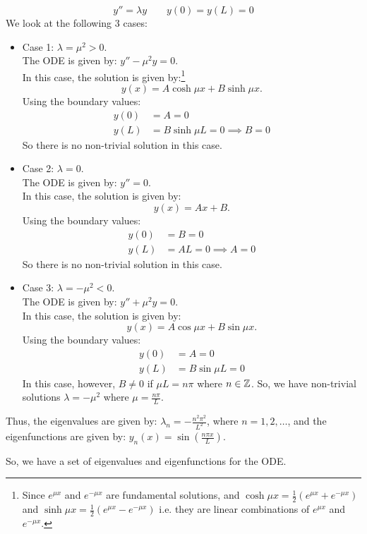 \begin{eg}
	\[
	y'' = \lambda y \qquad y(0) = y(L) = 0
	\]
	We look at the following 3 cases:
	\begin{itemize}
		\item Case 1: $\lambda = \mu^2 > 0$.\\
		The ODE is given by: $y'' - \mu^2 y = 0$.\\
		In this case, the solution is given by:\footnote{Since $e^{\mu x}$ and $e^{-\mu x}$ are fundamental solutions, and $\cosh{\mu x} = \frac12(e^{\mu x} + e^{-\mu x})$ and $\sinh{\mu x} = \frac12(e^{\mu x} - e^{-\mu x})$ i.e. they are linear combinations of $e^{\mu x}$ and $e^{-\mu x}$.}
		\[
		y(x) = A \cosh{\mu x} + B \sinh{\mu x}.
		\]
		Using the boundary values:
		\begin{align*}
			y(0) &= A = 0 \\
			y(L) &= B \sinh{\mu L} = 0 \implies B=0
		\end{align*}
		So there is no non-trivial solution in this case.
		
		\item Case 2: $\lambda = 0$.\\
		The ODE is given by: $y''= 0$.\\
		In this case, the solution is given by:
		\[
		y(x) = Ax + B.
		\]
		Using the boundary values:
		\begin{align*}
			y(0) &= B = 0 \\
			y(L) &= AL = 0 \implies A = 0
		\end{align*}
		So there is no non-trivial solution in this case.
		
		\item Case 3: $\lambda = -\mu^2 < 0$.\\
		The ODE is given by: $y'' + \mu^2 y = 0$.\\
		In this case, the solution is given by:
		\[
		y(x) = A \cos{\mu x} + B \sin{\mu x}.
		\]
		Using the boundary values:
		\begin{align*}
			y(0) &= A = 0 \\
			y(L) &= B \sin{\mu L} = 0
		\end{align*}
		In this case, however, $B \neq 0$ if $\mu L = n \pi$ where $n \in \mathbb{Z}$. So, we have non-trivial solutions $\lambda = -\mu^2$ where $\mu = \frac{n \pi}{L}$.
	\end{itemize}
	Thus, the eigenvalues are given by: $\lambda_n = -\frac{n^2\pi^2}{L^2}$, where $n = 1, 2, \dots$, and the eigenfunctions are given by: $y_n(x) = \sin\left(\frac{n\pi x}{L}\right)$.
	
	So, we have a set of eigenvalues and eigenfunctions for the ODE.
\end{eg}

